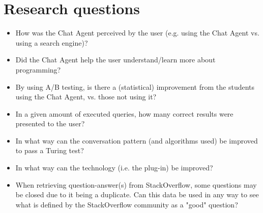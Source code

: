 \section{Research questions}
\label{chapter2:research_questions}
\begin{itemize}
	\item How was the Chat Agent perceived by the user (e.g. using the Chat Agent vs. using a search engine)?
	\item Did the Chat Agent help the user understand/learn more about programming?
	\item By using A/B testing, is there a (statistical) improvement from the students using the Chat Agent, vs. those not using it?
	\item In a given amount of executed queries, how many correct results were presented to the user? 
	\item In what way can the conversation pattern (and algorithms used) be improved to pass a Turing test?
	\item In what way can the technology (i.e. the plug-in) be improved? 
	\item When retrieving question-answer(s) from StackOverflow, some questions may be closed due to it being a duplicate. 
	Can this data be used in any way to see what is defined by the StackOverflow community as a "good" question?
\end{itemize}


